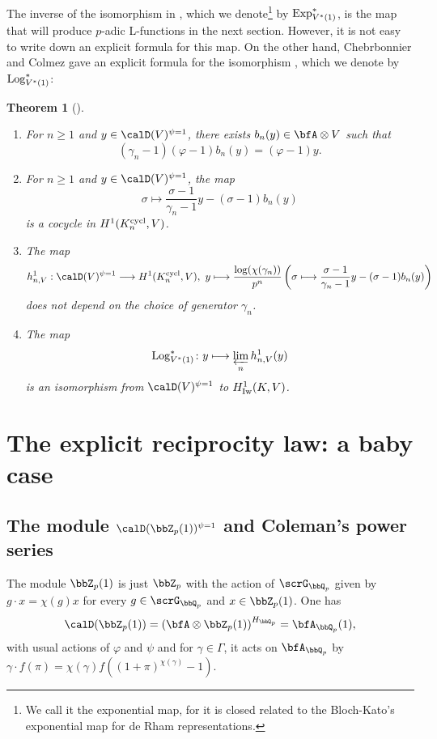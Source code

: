 \documentclass[a4paper,oneside]{amsart}
\newtheorem{theorem}{Theorem}[section]
\numberwithin{equation}{section}
\numberwithin{figure}{section}
\begin{document}
The inverse of the isomorphism  in , which we denote\footnote{We call it the exponential map, for it is closed related to the Bloch-Kato's exponential map for de Rham representations.} by $\operatorname{Exp}^*_{V^*(1)}$, is the map that will produce $p$-adic L-functions in the next section. However, it is not easy to write down an explicit formula for this map. On the other hand, Chebrbonnier and Colmez gave an explicit formula for the isomorphism , which we denote by $\operatorname{Log}^*_{V^*(1)}$:
\begin{theorem}[{\cite[Section I.5, Th\'eor\`eme II.1.3]{cherbonnier_theorie_1999}}]\label{thm:28958}\leavevmode
    \begin{enumerate}
        \item For $n\geq 1$ and $y\in\calD(V)^{\psi=1}$, there exists $b_n(y)\in \bfA\otimes V$ such that $$(\gamma_n-1)(\varphi-1)b_n(y)=(\varphi-1)y.$$
        \item For $n\geq 1$ and $y\in\calD(V)^{\psi=1}$, the map
              $$\sigma\longmapsto \frac{\sigma-1}{\gamma_n-1}y-(\sigma-1)b_n(y)$$
              is a cocycle in $H^1(K_n^{\operatorname{cycl}},V)$.
        \item The map
              $$h_{n,V}^1:\calD(V)^{\psi=1}\lto H^1(K_n^{\opn{cycl}},V),\ y\longmapsto \frac{\log(\chi(\gamma_n))}{p^n}\left(\sigma\longmapsto \frac{\sigma-1}{\gamma_n-1}y-(\sigma-1)b_n(y)\right)$$
              does not depend on the choice of generator $\gamma_n$.
        \item The map $$\operatorname{Log}^*_{V^*(1)}\colon y\longmapsto \varprojlim_n h_{n,V}^1(y)$$ is an isomorphism from $\calD(V)^{\psi=1}$ to $H_{\operatorname{Iw}}^1(K,V)$.
    \end{enumerate}
\end{theorem}
\section{The explicit reciprocity law: a baby case}
\subsection{The module $\calD(\bbZ_p(1))^{\psi=1}$ and Coleman's power series}
The module $\bbZ_p(1)$ is just $\bbZ_p$ with the action of $\scrG_{\bbQ_p}$ given by $g\cdot x=\chi(g)x$ for every $g\in\scrG_{\bbQ_p}$ and $x\in\bbZ_p(1)$. One has
$$\calD(\bbZ_p(1))=\left(\bfA\otimes\bbZ_p(1)\right)^{H_{\bbQ_p}}=\bfA_{\bbQ_p}(1),$$
with usual actions of $\varphi$ and $\psi$ and for $\gamma\in\Gamma$, it acts on $\bfA_{\bbQ_p}$ by $\gamma\cdot f(\pi)=\chi(\gamma)f((1+\pi)^{\chi(\gamma)}-1)$.
\end{document}
